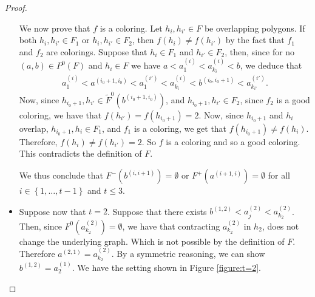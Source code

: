 \documentclass[12pt]{article}
\theoremstyle{definition}
\begin{document}
\begin{proof}
\begin{itemize}
             We now prove that $f$ is a coloring.
             Let $h_{i}, h_{i'} \in F$ be overlapping
             polygons. If both $h_{i}, h_{i'} \in F_1$ 
             or $h_{i}, h_{i'} \in F_2$, then 
             $f\left(h_{i}\right) \neq f\left(h_{i'}\right)$
             by the fact that $f_1$ and $f_2$ 
             are colorings.
             Suppose that $h_{i} \in F_1$ and
             $h_{i'} \in F_2$, then, since for no
             $\left(a, b\right) \in P^{0}\left(F\right)$ 
             and $h_{i} \in F$ we have
             $a < a_{1}^{\left(i\right)} <
             a_{k_{i}}^{\left(i\right)} < b$, we deduce that
             \begin{gather*}
                 a_1^{\left(i\right)} < 
                 a^{\left(i_0+1, i_0\right)} <
                 a_1^{\left(i'\right)} < 
                 a_{k_{i}}^{\left(i\right)} < 
                 b^{\left(i_0, i_0+1\right)} < 
                 a_{k_{i'}}^{\left(i'\right)}.
             \end{gather*}
             Now, since $h_{i_0+1}, h_{i'} \in 
             \widetilde{F}^{0}\left(b^{\left(i_0+1, i_0\right)}\right)$,
             and $h_{i_0+1}, h_{i'} \in F_2$,
             since $f_2$ is a good
             coloring, we have that $f\left(h_{i'}\right) =
             f\left(h_{i_0+1}\right) = 2$.
             Now, since $h_{i_0+1}$ and $h_{i}$ 
             overlap, 
             $h_{i_0+1}, h_{i} \in F_1$,
             and $f_1$ is a coloring, we get
             that $f\left(h_{i_0+1}\right) \neq
             f\left(h_{i}\right)$.
             Therefore, $f\left(h_{i}\right) \neq 
             f\left(h_{i'}\right) = 2$.
             So $f$ is a coloring and so
             a good coloring.
             This contradicts the definition
             of $F$.

             We thus conclude that
             $F^{-}\left(b^{\left(i, i+1\right)}\right) = \emptyset$ 
             or $F^{+}\left(a^{\left(i+1, i\right)}\right) = \emptyset$
             for all
             $i \in \left\{1, \ldots, t-1\right\}$ and
             $t \leq 3$.

             \item Suppose now that $t = 2$.
             Suppose that there exists
             $b^{\left(1,2\right)} < 
             a_{j}^{\left(2\right)} <
             a_{k_2}^{\left(2\right)}$.
             Then, since $F^{0}\left(a_{k_2}^{\left(2\right)}\right) = 
             \emptyset$, we have that 
             contracting $a_{k_2}^{\left(2\right)}$
             in $h_2$, does not change the underlying 
             graph. Which is not possible by
             the definition of $F$.
             Therefore $a^{\left(2,1\right)} =
             a_{k_2}^{\left(2\right)}$. By a
             symmetric reasoning, we can show
             $b^{\left(1, 2\right)} = a_2^{\left(1\right)}$.
             We have the setting shown in Figure \ref{figure:t=2}.


\end{itemize}
\end{proof}
\end{document}
